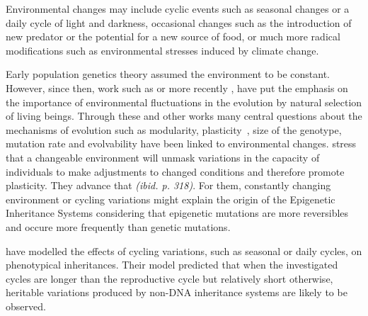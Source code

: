 Environmental changes may include cyclic events such as seasonal changes or a daily cycle of light and darkness, occasional changes such as the introduction of new predator or the potential for a new source of food, or much more radical modifications such as environmental stresses induced by climate change.

Early population genetics theory assumed the environment to be constant. However, since then, work such as \citep{levins1968evolution} or more recently \citep{jablonka2014evolution}, have put the emphasis on the importance of environmental fluctuations in the evolution by natural selection of living beings. Through these and other works many central questions about the mechanisms of evolution such as modularity, plasticity~\citep{west2005developmental}, size of the genotype, mutation rate and evolvability have been linked to environmental changes. \cite{jablonka2014evolution} stress that a changeable environment will unmask variations in the capacity of individuals to make adjustments to changed conditions and therefore promote plasticity. They advance that \emph{(ibid. p. 318)}. For them, constantly changing environment or cycling variations might explain the origin of the Epigenetic Inheritance Systems  considering that epigenetic mutations are more reversibles and occure more frequently than genetic mutations. 

\cite{lachmann1996inheritance} have modelled the effects of cycling variations, such as seasonal or daily cycles, on phenotypical inheritances. Their model predicted that when the investigated cycles are longer than the reproductive cycle but relatively short otherwise, heritable variations produced by non-DNA inheritance systems are likely to be observed. 

